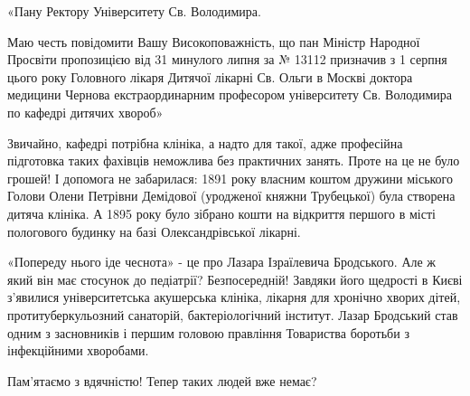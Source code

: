 «Пану Ректору Університету Св. Володимира.

Маю честь повідомити Вашу Високоповажність, що пан Міністр Народної Просвіти
пропозицією від 31 минулого липня за № 13112 призначив з 1 серпня цього року
Головного лікаря Дитячої лікарні Св. Ольги в Москві доктора медицини Чернова
екстраординарним професором університету Св. Володимира по кафедрі дитячих
хвороб»

Звичайно, кафедрі потрібна клініка, а надто для такої, адже професійна
підготовка таких фахівців неможлива без практичних занять. Проте на це не було
грошей! І допомога не забарилася: 1891 року власним коштом дружини міського
Голови Олени Петрівни Демідової (уродженої княжни Трубецької) була створена
дитяча клініка. А 1895 року було зібрано кошти на відкриття першого в місті
пологового будинку на базі Олександрівської лікарні.

«Попереду нього іде чеснота» - це про Лазара Ізраїлевича Бродського. Але ж який
він має стосунок до педіатрії? Безпосередній! Завдяки його щедрості в Києві
з’явилися університетська акушерська клініка, лікарня для хронічно хворих
дітей, протитуберкульозний санаторій, бактеріологічний інститут. Лазар
Бродський став одним з засновників і першим головою правління Товариства
боротьби з інфекційними хворобами. 

Пам’ятаємо з вдячністю! Тепер таких людей вже немає?

